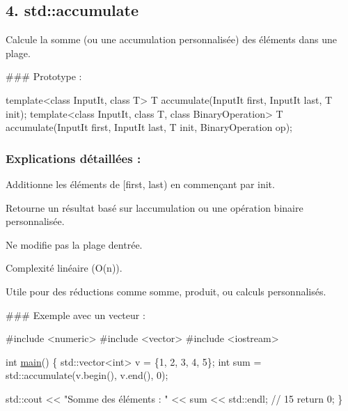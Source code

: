 \subsection*{4. {\bfseries std\+::accumulate}}

Calcule la somme (ou une accumulation personnalisée) des éléments dans une plage.

\#\#\# Prototype \+: 
\begin{DoxyCode}
\textcolor{keyword}{template}<\textcolor{keyword}{class} InputIt, \textcolor{keyword}{class} T>
T accumulate(InputIt first, InputIt last, T init);
\textcolor{keyword}{template}<\textcolor{keyword}{class} InputIt, \textcolor{keyword}{class} T, \textcolor{keyword}{class} BinaryOperation>
T accumulate(InputIt first, InputIt last, T init, BinaryOperation op);
\end{DoxyCode}


\subsubsection*{Explications détaillées \+:}


\begin{DoxyItemize}
\item Additionne les éléments de {\ttfamily \mbox{[}first, last)} en commençant par {\ttfamily init}.
\item Retourne un résultat basé sur l\textquotesingle{}accumulation ou une opération binaire personnalisée.
\item Ne modifie pas la plage d\textquotesingle{}entrée.
\item Complexité linéaire (O(n)).
\item Utile pour des réductions comme somme, produit, ou calculs personnalisés.
\end{DoxyItemize}

\#\#\# Exemple avec un vecteur \+: 
\begin{DoxyCode}
\textcolor{preprocessor}{#include <numeric>}
\textcolor{preprocessor}{#include <vector>}
\textcolor{preprocessor}{#include <iostream>}

\textcolor{keywordtype}{int} \hyperlink{htop_8c_a3c04138a5bfe5d72780bb7e82a18e627}{main}() \{
    std::vector<int> v = \{1, 2, 3, 4, 5\};
    \textcolor{keywordtype}{int} sum = std::accumulate(v.begin(), v.end(), 0);

    std::cout << \textcolor{stringliteral}{"Somme des éléments : "} << sum << std::endl; \textcolor{comment}{// 15}
    \textcolor{keywordflow}{return} 0;
\}
\end{DoxyCode}
 



